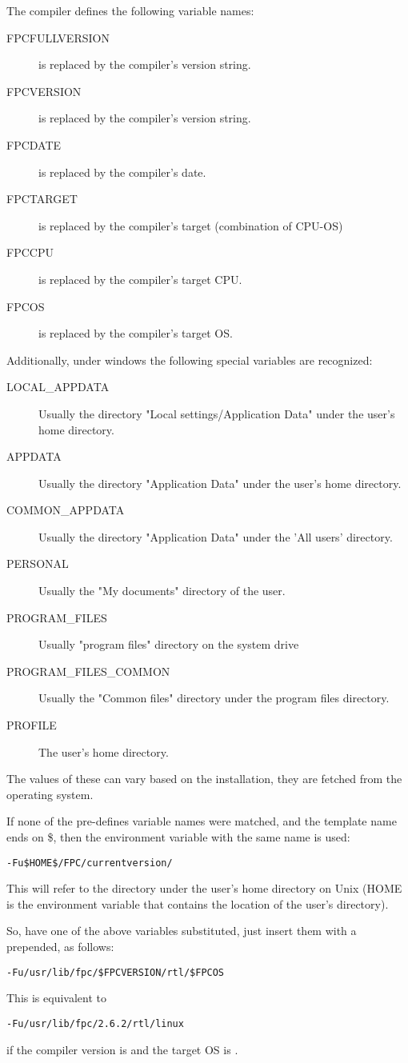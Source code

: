 The compiler defines the following variable names:
\begin{description}
\item[FPCFULLVERSION] is replaced by the compiler's version string.
\item[FPCVERSION] is replaced by the compiler's version string.
\item[FPCDATE] is replaced by the compiler's date.
\item[FPCTARGET] is replaced by the compiler's target (combination of CPU-OS)
\item[FPCCPU] is replaced by the compiler's target CPU.
\item[FPCOS] is replaced by the compiler's target OS.
\end{description}
Additionally, under windows the following special variables are recognized:
\begin{description}
\item[LOCAL\_APPDATA]  Usually the directory "Local settings/Application Data" under the user's home directory.
\item[APPDATA] Usually the directory "Application Data" under the user's home directory.
\item[COMMON\_APPDATA] Usually the directory "Application Data" under the 'All users' directory.
\item[PERSONAL] Usually the "My documents" directory of the user. 
\item[PROGRAM\_FILES] Usually "program files" directory on the system drive
\item[PROGRAM\_FILES\_COMMON] Usually the "Common files" directory under the program files directory.
\item[PROFILE] The user's home directory.
\end{description}
The values of these can vary based on the installation, they are fetched from the operating system.

If none of the pre-defines variable names were matched, and the template name ends on \$, 
then the environment variable with the same name is used:
\begin{verbatim}
-Fu$HOME$/FPC/currentversion/
\end{verbatim}
This will refer to the directory  under the user's home
directory on Unix (HOME is the environment variable that contains the
location of the user's directory).

So, have one of the above variables substituted, just insert them with a \var{\$}
prepended, as follows:
\begin{verbatim}
-Fu/usr/lib/fpc/$FPCVERSION/rtl/$FPCOS
\end{verbatim}
This is equivalent to
\begin{verbatim}
-Fu/usr/lib/fpc/2.6.2/rtl/linux
\end{verbatim}
if the compiler version is  and the target OS is \linux{}.

